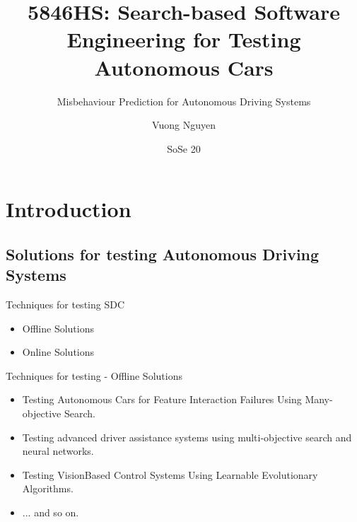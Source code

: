 \documentclass[aspectratio=1610,17pt,utf8]{beamer}
\title[Misbehaviour Prediction for SDC]{5846HS: Search-based Software Engineering for Testing Autonomous Cars}
\subtitle{Misbehaviour Prediction for Autonomous Driving Systems}
\author[Vuong Nguyen]{Vuong Nguyen}
\institute[Fakultät]
{
  Universität Passau\\
  Lehrstuhl für Software Engineering II\\
}
\date{SoSe 20}
\begin{document}
\begin{frame}[plain]
  \titlepage
\end{frame}

\begin{frame}[plain]
  \tableofcontents
\end{frame}


\section{Introduction}

\subsection{Solutions for testing Autonomous Driving Systems}
\begin{frame}{Techniques for testing SDC}
  \begin{itemize}
    \item Offline Solutions
    \item Online Solutions
  \end{itemize}
\end{frame}

\begin{frame}{Techniques for testing - Offline Solutions}
  \begin{itemize}
    \item Testing Autonomous Cars for Feature Interaction Failures Using Many-objective Search.
    \item Testing advanced driver assistance systems using multi-objective search and neural networks.
    \item Testing VisionBased Control Systems Using Learnable Evolutionary Algorithms.
    \item ... and so on.
  \end{itemize}
\end{frame}
\end{document}
